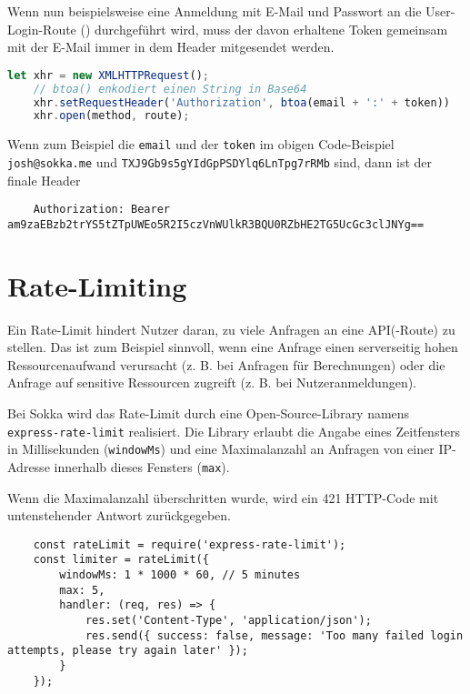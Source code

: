 Wenn nun beispielsweise eine Anmeldung mit E-Mail und Passwort an die User-Login-Route () durchgeführt wird, muss der davon erhaltene Token gemeinsam mit der E-Mail immer in dem Header mitgesendet werden.

\begin{lstlisting}[language=JavaScript]
    let xhr = new XMLHTTPRequest();
    // btoa() enkodiert einen String in Base64
    xhr.setRequestHeader('Authorization', btoa(email + ':' + token))
    xhr.open(method, route);
\end{lstlisting}

Wenn zum Beispiel die \lstinline{email} und der \lstinline{token} im obigen Code-Beispiel \lstinline{josh@sokka.me} und \lstinline{TXJ9Gb9s5gYIdGpPSDYlq6LnTpg7rRMb} sind, dann ist der finale Header

\begin{lstlisting}
    Authorization: Bearer am9zaEBzb2trYS5tZTpUWEo5R2I5czVnWUlkR3BQU0RZbHE2TG5UcGc3clJNYg==
\end{lstlisting}

\section{Rate-Limiting}

Ein Rate-Limit hindert Nutzer daran, zu viele Anfragen an eine API(-Route) zu stellen. Das ist zum Beispiel sinnvoll, wenn eine Anfrage einen serverseitig hohen Ressourcenaufwand verursacht (z. B. bei Anfragen für Berechnungen) oder die Anfrage auf sensitive Ressourcen zugreift (z. B. bei Nutzeranmeldungen).

Bei Sokka wird das Rate-Limit durch eine Open-Source-Library namens \lstinline{express-rate-limit} realisiert. Die Library erlaubt die Angabe eines Zeitfensters in Millisekunden (\lstinline{windowMs}) und eine Maximalanzahl an Anfragen von einer IP-Adresse innerhalb dieses Fensters (\lstinline{max}).

Wenn die Maximalanzahl überschritten wurde, wird ein 421 HTTP-Code mit untenstehender Antwort zurückgegeben. \cite{nfriedly2021}

\begin{lstlisting}
    const rateLimit = require('express-rate-limit');
    const limiter = rateLimit({
        windowMs: 1 * 1000 * 60, // 5 minutes
        max: 5,
        handler: (req, res) => {
            res.set('Content-Type', 'application/json');
            res.send({ success: false, message: 'Too many failed login attempts, please try again later' });
        }
    });
\end{lstlisting}

